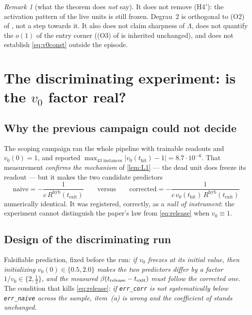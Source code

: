 \documentclass[11pt]{article}
\theoremstyle{remark}
\newtheorem{remark}[theorem]{Remark}
\newcommand{\thit}{t_{\mathrm{hit}}}
\newcommand{\texit}{t_{\mathrm{exit}}}
\newcommand{\hyb}{\mathrm{hyb}}
\newcommand{\hyplabel}[1]{\textup{(#1)}}
\begin{document}
\begin{remark}[what the theorem does \emph{not} say]
It does not remove \hyplabel{H4$'$}: the activation pattern of the live units is
still frozen. Degrau~2 is orthogonal to (O2) of \cite{paper}, not a step towards
it. It also does not claim sharpness of $\Lambda$, does not quantify the
$o(1)$ of the entry corner ((O3) of \cite{paper} is inherited unchanged), and
does not establish \eqref{eq:v0const} outside the episode.
\end{remark}

\section{\texorpdfstring{The discriminating experiment: is the $v_0$ factor real?}{The discriminating experiment: is the v0 factor real?}}\label{sec:num}

\subsection{Why the previous campaign could not decide}

The scoping campaign \cite{scoping} ran the whole pipeline with trainable
readouts and $v_0(0)=1$, and reported
$\max_{43\text{ instances}}|v_0(\thit)-1|=8.7\cdot10^{-6}$. That measurement
\emph{confirms the mechanism} of \cref{lem:L1} --- the dead unit does freeze its
readout --- but it makes the two candidate predictors
\[
\text{naive}=-\frac{1}{c\,R^{\hyb}(\texit)}
\qquad\text{versus}\qquad
\text{corrected}=-\frac{1}{c\,v_0(\thit)\,R^{\hyb}(\texit)}
\]
numerically identical. It was registered, correctly, as a \emph{null of
instrument}: the experiment cannot distinguish the paper's law from
\eqref{eq:release} when $v_0\equiv1$.

\subsection{Design of the discriminating run}

Falsifiable prediction, fixed before the run: \emph{if $v_0$ freezes at its
initial value, then initializing $v_0(0)\in\{0.5,2.0\}$ makes the two predictors
differ by a factor $1/v_0\in\{2,\tfrac12\}$, and the measured
$\beta(t_{\rm release}-\texit)$ must follow the corrected one.} The condition
that kills \eqref{eq:release}: \emph{if \texttt{err\_corr} is not systematically
below \texttt{err\_naive} across the sample, item~(a) is wrong and the
coefficient of \cite[Thm.~6]{paper} stands unchanged.}
\end{document}
